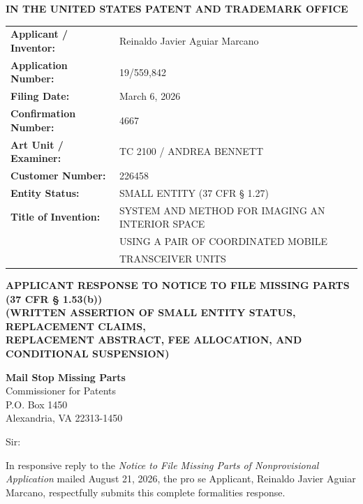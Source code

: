 \documentclass[11pt,letterpaper]{article}
\begin{document}
\thispagestyle{empty}

\begin{center}
    \textbf{\large IN THE UNITED STATES PATENT AND TRADEMARK OFFICE}
\end{center}

\vspace{0.3cm}
\noindent\begin{tabular}{p{2.3in}p{4.0in}}
\textbf{Applicant / Inventor:} & Reinaldo Javier Aguiar Marcano \\
\textbf{Application Number:} & 19/559,842 \\
\textbf{Filing Date:} & March 6, 2026 \\
\textbf{Confirmation Number:} & 4667 \\
\textbf{Art Unit / Examiner:} & TC 2100 / ANDREA BENNETT \\
\textbf{Customer Number:} & 226458 \\
\textbf{Entity Status:} & SMALL ENTITY (37 CFR \S{} 1.27) \\
\textbf{Title of Invention:} & SYSTEM AND METHOD FOR IMAGING AN INTERIOR SPACE \\
& USING A PAIR OF COORDINATED MOBILE \\
& TRANSCEIVER UNITS \\
\end{tabular}

\vspace{0.4cm}
\begin{center}
    \textbf{\large APPLICANT RESPONSE TO NOTICE TO FILE MISSING PARTS \\
    (37 CFR \S{} 1.53(b))} \\
    \textbf{\normalsize (WRITTEN ASSERTION OF SMALL ENTITY STATUS, REPLACEMENT CLAIMS, \\
    REPLACEMENT ABSTRACT, FEE ALLOCATION, AND CONDITIONAL SUSPENSION)}
\end{center}

\noindent\textbf{Mail Stop Missing Parts} \\
Commissioner for Patents \\
P.O. Box 1450 \\
Alexandria, VA 22313-1450

\vspace{0.2cm}
Sir:

In responsive reply to the \textit{Notice to File Missing Parts of Nonprovisional Application} mailed August 21, 2026, the pro se Applicant, Reinaldo Javier Aguiar Marcano, respectfully submits this complete formalities response.
\end{document}
